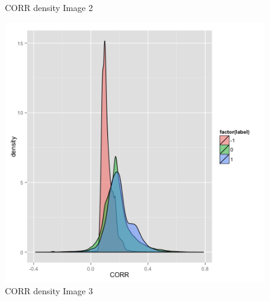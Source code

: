 \documentclass{article}\usepackage[]{graphicx}\usepackage[]{color}
\begin{document}
\begin{figure}[h]
  \caption{CORR density Image 2}\label{}
\endminipage\hfill
{}%
  \includegraphics[width=\linewidth]{CORR3.png}
  \caption{CORR density Image 3}\label{}
\endminipage
\end{figure}
\end{document}
